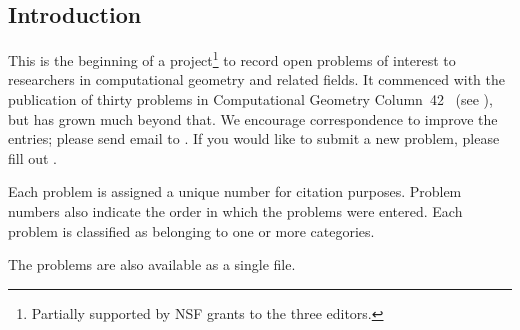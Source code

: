 \subsection{Introduction}
This is the beginning of a project\footnote{
Partially supported by NSF grants to the three editors.} 
to record open problems
of interest to researchers in computational geometry and
related fields.  It commenced with the publication of
thirty problems in Computational Geometry Column~42~\cite{mo-cgc42-01}
(see ),
but has grown much beyond that.
We encourage correspondence to improve the entries; please send email to
.
If you would like to submit a new problem, please fill out
.

Each problem is assigned a unique number for citation purposes.
Problem numbers also indicate the order in which the problems were entered.
Each problem is classified as belonging to one or more categories.

The problems are also available as a single
file.

